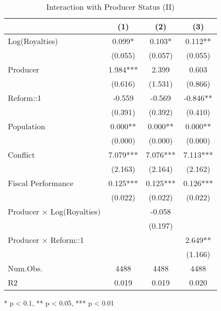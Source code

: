 \begin{table}[t]
\caption*{
{\large Interaction with Producer Status (II)}
} 
\fontsize{12.0pt}{14.4pt}\selectfont
\begin{tabular*}{\linewidth}{@{\extracolsep{\fill}}lccc}
\toprule
  & (1) & (2) & (3) \\ 
\midrule\addlinespace[2.5pt]
Log(Royalties) & 0.099* & 0.103* & 0.112** \\ 
 & (0.055) & (0.057) & (0.055) \\ 
Producer & 1.984*** & 2.399 & 0.603 \\ 
 & (0.616) & (1.531) & (0.866) \\ 
Reform::1 & -0.559 & -0.569 & -0.846** \\ 
 & (0.391) & (0.392) & (0.410) \\ 
Population & 0.000** & 0.000** & 0.000** \\ 
 & (0.000) & (0.000) & (0.000) \\ 
Conflict & 7.079*** & 7.076*** & 7.113*** \\ 
 & (2.163) & (2.164) & (2.162) \\ 
Fiscal Performance & 0.125*** & 0.125*** & 0.126*** \\ 
 & (0.022) & (0.022) & (0.022) \\ 
Producer × Log(Royalties) &  & -0.058 &  \\ 
 &  & (0.197) &  \\ 
Producer × Reform::1 &  &  & 2.649** \\ 
{} & {} & {} & {(1.166)} \\ 
Num.Obs. & 4488 & 4488 & 4488 \\ 
R2 & 0.019 & 0.019 & 0.020 \\ 
\bottomrule
\end{tabular*}
\begin{minipage}{\linewidth}
* p < 0.1, ** p < 0.05, *** p < 0.01\\
\end{minipage}
\end{table}

